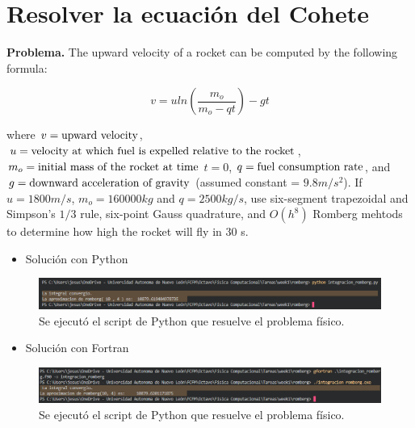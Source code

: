 \section{Resolver la ecuación del Cohete}

\vspace{0.5cm}

\noindent \textbf{Problema.} The upward velocity of a rocket can be computed by the following formula:

\begin{equation*}
    v = u ln\left(\frac{m_o}{m_o -qt}\right) -gt
\end{equation*}

\noindent where $v = \textnormal{upward velocity} $,  $u = \textnormal{velocity at which fuel is expelled relative to the rocket}$, $m_o = \textnormal{initial mass of the rocket at time} $ $t=0$,  $q = \textnormal{fuel consumption rate}$, and $g = \textnormal{downward acceleration of gravity}$ (assumed constant = $9.8 m/s^2 $). If $u=1800m/s$, $m_o=160000kg$ and $q=2500kg/s$, use six-segment trapezoidal and Simpson's $1/3$ rule, six-point Gauss quadrature, and $O(h^8)$ Romberg mehtods to determine how high the rocket will fly in 30 s.

\begin{itemize}
    \item Solución con Python
\end{itemize}

\begin{figure}[h!]
    \centering
    \includegraphics[width=1\linewidth]{images/python.png}
    \caption{Se ejecutó el script de Python que resuelve el problema físico.}
    \label{fig_python}
\end{figure}

\begin{itemize}
    \item Solución con Fortran
\end{itemize}

\begin{figure}[H]
    \centering
    \includegraphics[width=1\linewidth]{images/fortran.png}
    \caption{Se ejecutó el script de Python que resuelve el problema físico.}
    \label{fig_fortran}
\end{figure}

